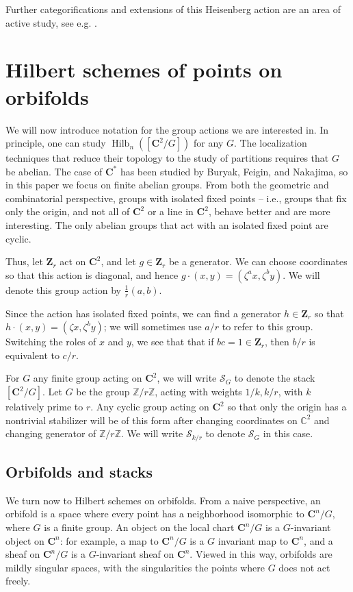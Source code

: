 \documentclass{amsart}[12pt]
\theoremstyle{definition}
\newcommand{\Z}{\mathbf{Z}}
\newcommand{\C}{\mathbf{C}}
\newcommand{\Sur}{\mathcal{S}}
\DeclareMathOperator{\Hilb}{Hilb}
\begin{document}
Further categorifications and extensions of this Heisenberg action are an area of active study, see e.g. \cite{CL, CL2, FT, SV}.







\section{Hilbert schemes of points on orbifolds}


We will now introduce notation for the group actions we are interested in.  In principle, one can study $\Hilb_n([\C^2/G])$ for any $G$.  The localization techniques that reduce their topology to the study of partitions requires that $G$ be abelian.  The case of $\C^*$ has been studied by Buryak, Feigin, and Nakajima, so in this paper we focus on finite abelian groups.  From both the geometric and combinatorial perspective, groups with isolated fixed points -- i.e., groups that fix only the origin, and not all of $\C^2$ or a line in $\C^2$, behave better and are more interesting.  The only abelian groups that act with an isolated fixed point are cyclic.

Thus, let $\Z_r$ act on $\C^2$, and let $g\in\Z_r$ be a generator.   We can choose coordinates so that this action is diagonal, and hence $g\cdot (x,y)=(\zeta^a x, \zeta^by)$.  We will denote this group action by $\frac{1}{r}(a, b)$.  

Since the action has isolated fixed points, we can find a generator $h\in\Z_r$ so that $h\cdot (x,y)=(\zeta x, \zeta^by)$; we will sometimes use $a/r$ to refer to this group. Switching the roles of $x$ and $y$, we see that that if $bc=1\in\Z_r$, then $b/r$ is equivalent to $c/r$.

For $G$ any finite group acting on $\C^2$, we will write $\Sur_G$ to denote the stack $[\C^2/G]$. Let $G$ be the group $\mathbb{Z}/r\mathbb{Z}$, acting with weights $1/k, k/r$, with $k$ relatively prime to $r$.  Any cyclic group acting on $\C^2$ so that only the origin has a nontrivial stabilizer will be of this form after changing coordinates on $\mathbb{C}^2$ and changing generator of $\mathbb{Z}/r\mathbb{Z}$.  We will write $\Sur_{k/r}$ to denote $\Sur_G$ in this case.




\subsection{Orbifolds and stacks}
We turn now to Hilbert schemes on orbifolds.  From a naive perspective, an orbifold is a space where every point has a neighborhood isomorphic to $\C^n/G$, where $G$ is a finite group.  An object on the local chart $\C^n/G$ is a $G$-invariant object on $\C^n$: for example, a map to $\C^n/G$ is a $G$ invariant map to $\C^n$, and a sheaf on $\C^n/G$ is a $G$-invariant sheaf on $\C^n$.  Viewed in this way, orbifolds are mildly singular spaces, with the singularities the points where $G$ does not act freely.
\end{document}
